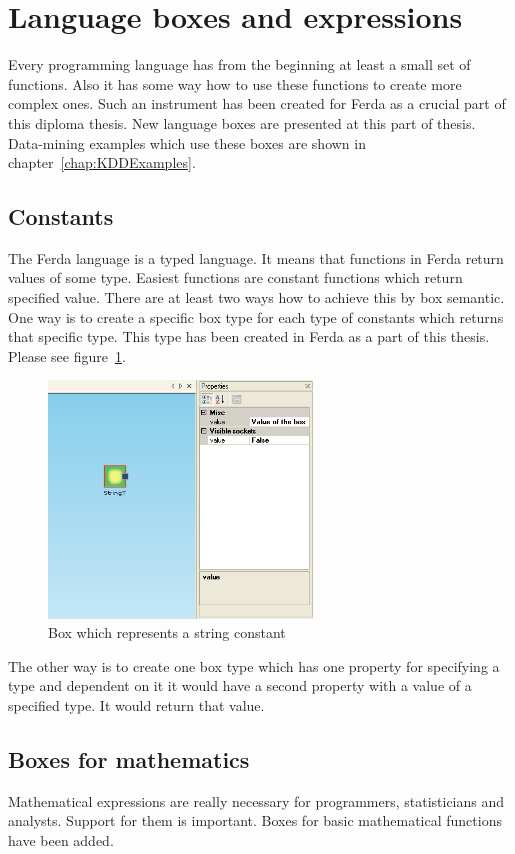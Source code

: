 \documentclass[a4paper,12pt]{book}
\begin{document}
\section{Language boxes and expressions}
\label{sectionNewBoxes}
Every programming language has from the beginning at least a small set of functions. Also it has some way how to use these functions to create more complex ones. Such an instrument has been created for Ferda as a crucial part of this diploma thesis. New language boxes are presented at this part of thesis. Data-mining examples which use these boxes are shown in chapter~\ref{chap:KDDExamples}.

\subsection{Constants}
The Ferda language is a typed language. It means that functions in Ferda return values of some type. Easiest functions are constant functions which return specified value. There are at least two ways how to achieve this by box semantic. One way is to create a specific box type for each type of constants which returns that specific type. This type has been created in Ferda as a part of this thesis. Please see figure~\ref{fig:constantBoxAlone}. 

\begin{figure}
	\centering
	\includegraphics[width=7cm]{constantBoxAlone}
	\caption{Box which represents a string constant}
	\label{fig:constantBoxAlone}
\end{figure}

The other way is to create one box type which has one property for specifying a type and dependent on it it would have a second property with a value of a specified type. It would return that value.

\subsection{Boxes for mathematics}
Mathematical expressions are really necessary for programmers, statisticians and analysts. Support for them is important. Boxes for basic mathematical functions have been added.
\end{document}
